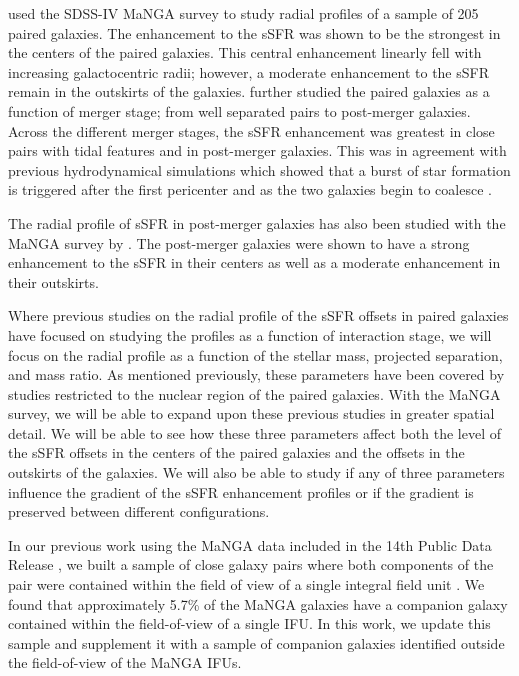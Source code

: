 \documentclass[iop,revtex4,twocolumn,apj,numberedappendix,appendixfloats]{emulateapj}
\begin{document}
\citet{Pan:2019} used the SDSS-IV MaNGA survey to study radial profiles of a sample of 205 paired galaxies. The enhancement to the sSFR was shown to be the strongest in the centers of the paired galaxies. This central enhancement linearly fell with increasing galactocentric radii; however, a moderate enhancement to the sSFR remain in the outskirts of the galaxies. \citet{Pan:2019} further studied the paired galaxies as a function of merger stage; from well separated pairs to post-merger galaxies. Across the different merger stages, the sSFR enhancement was greatest in close pairs with tidal features and in post-merger galaxies. This was in agreement with previous hydrodynamical simulations which showed that a burst of star formation is triggered after the first pericenter and as the two galaxies begin to coalesce \citep{Scudder:2012}. 

The radial profile of sSFR in post-merger galaxies has also been studied with the MaNGA survey by \citet{Thorp:2019}. The post-merger galaxies were shown to have a strong enhancement to the sSFR in their centers as well as a moderate enhancement in their outskirts. 

Where previous studies on the radial profile of the sSFR offsets in paired galaxies have focused on studying the profiles as a function of interaction stage, we will focus on the radial profile as a function of the stellar mass, projected separation, and mass ratio. As mentioned previously, these parameters have been covered by studies restricted to the nuclear region of the paired galaxies. With the MaNGA survey, we will be able to expand upon these previous studies in greater spatial detail. We will be able to see how these three parameters affect both the level of the sSFR offsets in the centers of the paired galaxies and the offsets in the outskirts of the galaxies. We will also be able to study if any of three parameters influence the gradient of the sSFR enhancement profiles or if the gradient is preserved between different configurations. 

In our previous work using the MaNGA data included in the 14th Public Data Release \citep[DR14;][]{Abolfathi:2018}, we built a sample of close galaxy pairs where both components of the pair were contained within the field of view of a single integral field unit \citep[][hereafter ]{Fu:2018}. We found that approximately 5.7\% of the MaNGA galaxies have a companion galaxy contained within the field-of-view of a single IFU. In this work, we update this sample and supplement it with a sample of companion galaxies identified outside the field-of-view of the MaNGA IFUs. 
\end{document}
